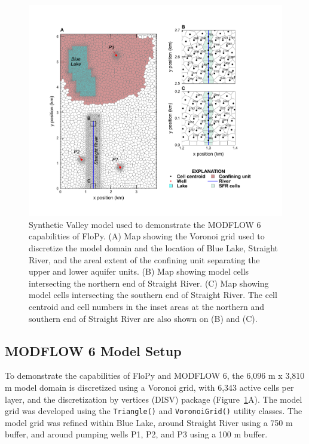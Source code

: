 \documentclass[12pt, oneside]{article}  	%
\begin{document}
\begin{figure}[ht!]
	\begin{center}
		\includegraphics{figure5.pdf}
	\end{center}
	\caption{Synthetic Valley model used to demonstrate the MODFLOW 6 capabilities of FloPy. (A) Map showing the Voronoi grid used to discretize the model domain and the location of Blue Lake, Straight River, and the areal extent of the confining unit separating the upper and lower aquifer units. (B) Map showing model cells intersecting the northern end of Straight River. (C) Map showing model cells intersecting the southern end of Straight River. The cell centroid and cell numbers in the inset areas at the northern and southern end of Straight River are also shown on (B) and (C).}
	\label{fig:mvgrid}
\end{figure}

\subsection*{MODFLOW 6 Model Setup}

To demonstrate the capabilities of FloPy and MODFLOW 6, the 6,096 m x 3,810 m model domain is discretized using a Voronoi grid, with 6,343 active cells per layer, and the discretization by vertices (DISV) package (Figure~\ref{fig:mvgrid}A). The model grid was developed using the \texttt{Triangle()} and \texttt{VoronoiGrid()} utility classes. The model grid was refined within Blue Lake, around Straight River using a 750 m buffer, and around pumping wells P1, P2, and P3 using a 100 m buffer.
\end{document}
